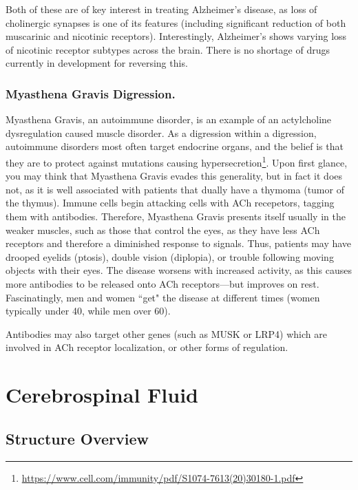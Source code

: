 \documentclass[12pt]{report}
\begin{document}
Both of these are of key interest in treating Alzheimer's disease, as loss of cholinergic synapses is one of its features (including significant reduction of both muscarinic and nicotinic receptors). Interestingly, Alzheimer's shows varying loss of nicotinic receptor subtypes across the brain. There is no shortage of drugs currently in development for reversing this.\newline

\subsubsection{Myasthena Gravis Digression.}
Myasthena Gravis, an autoimmune disorder, is an example of an actylcholine dysregulation caused muscle disorder. As a digression within a digression, autoimmune disorders most often target endocrine organs, and the belief is that they are to protect against mutations causing hypersecretion\footnote{\url{https://www.cell.com/immunity/pdf/S1074-7613(20)30180-1.pdf}}. Upon first glance, you may think that Myasthena Gravis evades this generality, but in fact it does not, as it is well associated with patients that dually have a thymoma (tumor of the thymus). Immune cells begin attacking cells with ACh recepetors, tagging them with antibodies. Therefore, Myasthena Gravis presents itself usually in the weaker muscles, such as those that control the eyes, as they have less ACh receptors and therefore a diminished response to signals. Thus, patients may have drooped eyelids (ptosis), double vision (diplopia), or trouble following moving objects with their eyes. The disease worsens with increased activity, as this causes more antibodies to be released onto ACh receptors---but improves on rest. Fascinatingly, men and women ``get" the disease at different times (women typically under 40, while men over 60).\newline

Antibodies may also target other genes (such as MUSK or LRP4) which are involved in ACh receptor localization, or other forms of regulation.


\section{Cerebrospinal Fluid}

\subsection{Structure Overview}
\end{document}
